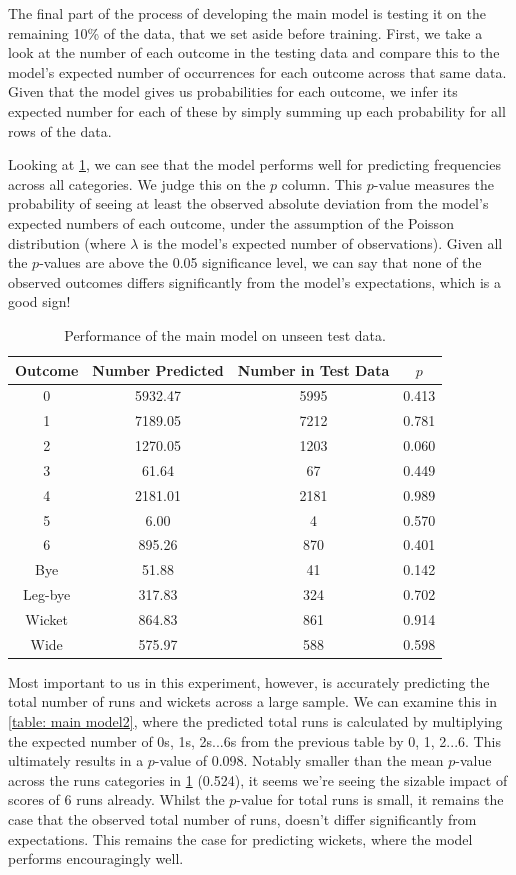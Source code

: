 The final part of the process of developing the main model is testing it on the remaining 10\% of the data, that we set aside before training. First, we take a look at the number of each outcome in the testing data and compare this to the model's expected number of occurrences for each outcome across that same data. Given that the model gives us probabilities for each outcome, we infer its expected number for each of these by simply summing up each probability for all rows of the data.

Looking at \cref{table: main model1}, we can see that the model performs well for predicting frequencies across all categories. We judge this on the $p$ column. This $p$-value measures the probability of seeing at least the observed absolute deviation from the model's expected numbers of each outcome, under the assumption of the Poisson distribution (where $\lambda$ is the model's expected number of observations). Given all the $p$-values are above the 0.05 significance level, we can say that none of the observed outcomes differs significantly from the model's expectations, which is a good sign!

\begin{table}[ht]
\centering
\begin{tabular} {c c c c} \toprule
    {Outcome} & {Number Predicted} & {Number in Test Data} & {$p$} \\ \midrule
     0 & 5932.47 & 5995 & 0.413 \\
     1 & 7189.05 & 7212 & 0.781 \\
     2 & 1270.05 & 1203 & 0.060 \\
     3 & 61.64 & 67 & 0.449 \\
     4 & 2181.01 & 2181 & 0.989 \\
     5 & 6.00 & 4 & 0.570 \\
     6 & 895.26 & 870 & 0.401 \\ \midrule
     Bye & 51.88 & 41 & 0.142 \\
     Leg-bye & 317.83 & 324 & 0.702 \\
     Wicket & 864.83 & 861 & 0.914 \\
     Wide & 575.97 & 588 & 0.598 \\ \bottomrule
\end{tabular}
\caption{Performance of the main model on unseen test data.}
\label{table: main model1}
\end{table}

Most important to us in this experiment, however, is accurately predicting the total number of runs and wickets across a large sample. We can examine this in \cref{table: main model2}, where the predicted total runs is calculated by multiplying the expected number of 0s, 1s, 2s...6s from the previous table by 0, 1, 2...6. This ultimately results in a $p$-value of 0.098. Notably smaller than the mean $p$-value across the runs categories in \cref{table: main model1} (0.524), it seems we're seeing the sizable impact of scores of 6 runs already. Whilst the $p$-value for total runs is small, it remains the case that the observed total number of runs, doesn't differ significantly from expectations. This remains the case for predicting wickets, where the model performs encouragingly well.

